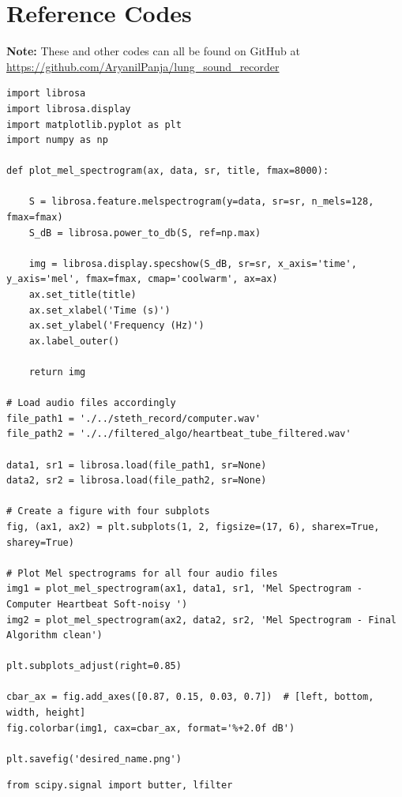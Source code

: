 \documentclass[conference]{IEEEtran}
\begin{document}
{\section*{Reference Codes}


\textbf{Note:} These and other codes can all be found on GitHub at \url{https://github.com/AryanilPanja/lung_sound_recorder}
\\


\begin{lstlisting}[style=mypython, caption={Code for Generating a Mel-Spectrogram}, label={lst:mel-spectrogram}]
import librosa
import librosa.display
import matplotlib.pyplot as plt
import numpy as np

def plot_mel_spectrogram(ax, data, sr, title, fmax=8000):

    S = librosa.feature.melspectrogram(y=data, sr=sr, n_mels=128, fmax=fmax)
    S_dB = librosa.power_to_db(S, ref=np.max)
    
    img = librosa.display.specshow(S_dB, sr=sr, x_axis='time', y_axis='mel', fmax=fmax, cmap='coolwarm', ax=ax)
    ax.set_title(title)
    ax.set_xlabel('Time (s)')
    ax.set_ylabel('Frequency (Hz)')
    ax.label_outer()

    return img

# Load audio files accordingly
file_path1 = './../steth_record/computer.wav'  
file_path2 = './../filtered_algo/heartbeat_tube_filtered.wav'  

data1, sr1 = librosa.load(file_path1, sr=None)
data2, sr2 = librosa.load(file_path2, sr=None)

# Create a figure with four subplots
fig, (ax1, ax2) = plt.subplots(1, 2, figsize=(17, 6), sharex=True, sharey=True)

# Plot Mel spectrograms for all four audio files
img1 = plot_mel_spectrogram(ax1, data1, sr1, 'Mel Spectrogram -  Computer Heartbeat Soft-noisy ')
img2 = plot_mel_spectrogram(ax2, data2, sr2, 'Mel Spectrogram - Final Algorithm clean')

plt.subplots_adjust(right=0.85)

cbar_ax = fig.add_axes([0.87, 0.15, 0.03, 0.7])  # [left, bottom, width, height]
fig.colorbar(img1, cax=cbar_ax, format='%+2.0f dB')

plt.savefig('desired_name.png')

\end{lstlisting}


\begin{lstlisting}[style=mypython, caption={Python code for Butterworth band-pass filter}]
from scipy.signal import butter, lfilter


\end{lstlisting}}
\end{document}
